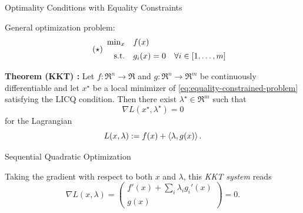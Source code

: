 \documentclass[9pt]{beamer}
\begin{document}
\begin{frame}{Optimality Conditions with Equality Constraints}

  General optimization problem:
  \begin{equation}
    \label{eq:equality-constrained-problem}
    \tag{$\star$}
    \begin{array}{rl}
      \min_{x} & f(x) \\[0.5em]
      \mathrm{s.t.} & g_i(x) = 0 \quad \forall i\in [1, \dots, m]
    \end{array}
  \end{equation}
  
  \vfill

  \textbf{Theorem (KKT) :} Let $f:\Re^n\to\Re$ and $g:\Re^n\to\Re^m$ be continuously differentiable and let $x^\star$ be a local minimizer of \eqref{eq:equality-constrained-problem} satisfying the LICQ condition. Then there exist $\lambda^\star\in\Re^m$ such that
  \[
    \nabla L(x^\star,\lambda^\star) = 0
  \]
  for the Lagrangian $$L(x,\lambda):= f(x)+\left<\lambda, g(x)\right>.$$
  

\end{frame}

\begin{frame}{Sequential Quadratic Optimization}

  Taking the gradient with respect to both $x$ and $\lambda$, this \emph{KKT system} reads
  \[
    \nabla L(x,\lambda) =
    \begin{pmatrix}
      f'(x)+\sum_i \lambda_i g_i'(x)\\
      g(x)
    \end{pmatrix}
    = 0.
  \]

  \vfill


\end{frame}
\end{document}
